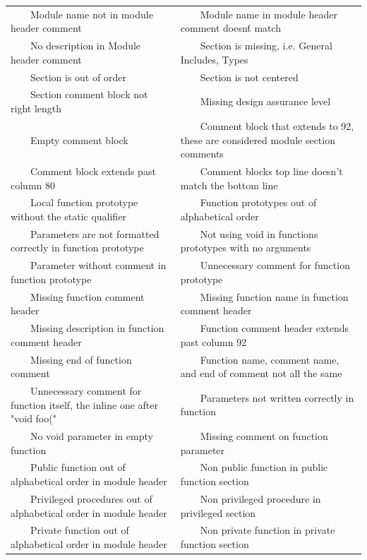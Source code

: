 \documentclass[11pt]{scrreprt}
\newcommand{\tabitem}{~~\llap{\textbullet}~~}
\begin{document}
\begin{longtable}{p{} p{}}
\tabitem Module name not in module header comment & \tabitem Module name in module header comment doesn\'t match\\
\tabitem No description in Module header comment & \tabitem Section is missing, i.e. General Includes, Types\\
\tabitem Section is out of order & \tabitem Section is not centered\\
\tabitem Section comment block not right length & \tabitem Missing design assurance level\\
\tabitem Empty comment block & \tabitem Comment block that extends to 92, these are considered module section comments\\
\tabitem Comment block extends past column 80 & \tabitem Comment blocks top line doesn't match the bottom line\\
\tabitem Local function prototype without the static qualifier & \tabitem Function prototypes out of alphabetical order\\
\tabitem Parameters are not formatted correctly in function prototype & \tabitem Not using void in functions prototypes with no arguments\\
\tabitem Parameter without comment in function prototype & \tabitem Unnecessary comment for function prototype\\
\tabitem Missing function comment header & \tabitem Missing function name in function comment header\\
\tabitem Missing description in function comment header & \tabitem Function comment header extends past column 92\\
\tabitem Missing end of function comment & \tabitem Function name, comment name, and end of comment not all the same\\
\tabitem Unnecessary comment for function itself, the inline one after "void foo(" & \tabitem Parameters not written correctly in function\\
\tabitem No void parameter in empty function & \tabitem Missing comment on function parameter\\
\tabitem Public function out of alphabetical order in module header & \tabitem Non public function in public function section\\
\tabitem Privileged procedures out of alphabetical order in module header & \tabitem Non privileged procedure in privileged section\\
\tabitem Private function out of alphabetical order in module header & \tabitem Non private function in private function section\\

\end{longtable}
\end{document}

